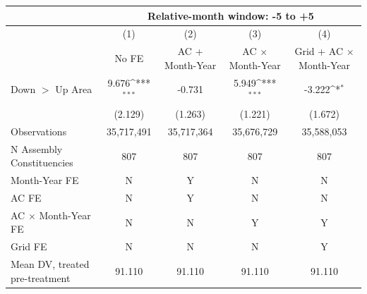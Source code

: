 {
\def\sym#1{\ifmmode^{#1}\else\(^{#1}\)\fi}
\begin{tabular}{l*{4}{c}}
\hline
&\multicolumn{4}{c}{Relative-month window: -5 to +5} \\ \hline
            &\multicolumn{1}{c}{(1)}&\multicolumn{1}{c}{(2)}&\multicolumn{1}{c}{(3)}&\multicolumn{1}{c}{(4)}\\
            &\multicolumn{1}{c}{No FE}&\multicolumn{1}{c}{AC + Month-Year}&\multicolumn{1}{c}{AC $\times$ Month-Year}&\multicolumn{1}{c}{Grid + AC $\times$ Month-Year}\\
\hline
Down $>$ Up Area&       9.676\sym{***}&      -0.731         &       5.949\sym{***}&      -3.222\sym{*}  \\
            &     (2.129)         &     (1.263)         &     (1.221)         &     (1.672)         \\
\hline
Observations&  35,717,491         &  35,717,364         &  35,676,729         &  35,588,053         \\
N Assembly Constituencies&         807         &         807         &         807         &         807         \\
Month-Year FE&           N         &           Y         &           N         &           N         \\
AC FE       &           N         &           Y         &           N         &           N         \\
AC $\times$ Month-Year FE&           N         &           N         &           Y         &           Y         \\
Grid FE     &           N         &           N         &           N         &           Y         \\
Mean DV, treated pre-treatment&      91.110         &      91.110         &      91.110         &      91.110         \\
\hline
\end{tabular}
}
